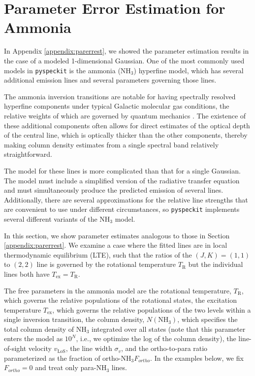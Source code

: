 \documentclass[twocolumn]{aastex63}
\newcommand{\pyspeckit}{\texttt{pyspeckit}\xspace}
\newcommand{\ammonia}{\ensuremath{\mathrm{NH}_3}\xspace}
\begin{document}
\section{Parameter Error Estimation for Ammonia}
\label{appendix:parerrestammonia}
In Appendix \ref{appendix:parerrest}, we showed the parameter estimation results
in the case of a modeled 1-dimensional Gaussian.  One of the most commonly used
models in \pyspeckit is the ammonia (\ammonia) hyperfine model, which has several
additional emission lines and several parameters governing those lines.

The ammonia inversion transitions are notable for having spectrally resolved
hyperfine components under typical Galactic molecular gas conditions, the relative weights of which are governed by quantum
mechanics \citep{Mangum2015}. The existence of these additional components often
allows for direct estimates of the optical depth of the central line, which is
optically thicker than the other components, thereby making column density
estimates from a single spectral band relatively straightforward.

The model for these lines is more complicated than that for a single Gaussian.
The model must include a simplified version of the radiative transfer equation
and must simultaneously produce the predicted emission of several lines.
Additionally, there are several approximations for the relative line strengths that are convenient to use
under different circumstances, so \pyspeckit implements several different
variants of the \ammonia model.

In this section, we show parameter estimates analogous to those in Section
\ref{appendix:parerrest}.
We examine a case where the fitted lines are in local
thermodynamic equilibrium (LTE), such that the ratios of the $(J,K)=(1,1)$
to $(2,2)$ line is governed by the rotational temperature $T_\mathrm{R}$ but
the individual lines both have $T_{\mathrm{ex}}=T_{\mathrm{R}}$.

The free parameters in the ammonia model are the rotational temperature,
$T_{\mathrm{R}}$, which governs the relative populations of the rotational
states, the excitation temperature $T_{\mathrm{ex}}$, which governs the
relative populations of the two levels within a single inversion transition,
the column density, $N(\ammonia)$, which specifies the total column density of
\ammonia integrated over all states (note that this parameter enters the model
as $10^N$, i.e., we optimize the log of the column density), the line-of-sight
velocity $v_\mathrm{LoS}$, the line width $\sigma_v$, and the ortho-to-para
ratio parameterized as the fraction of ortho-\ammonia $F_{ortho}$.  In the
examples below, we fix $F_{ortho}=0$ and treat only para-\ammonia lines.
\end{document}
